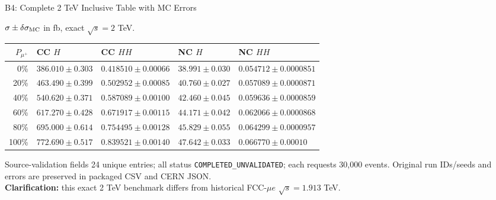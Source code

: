 \documentclass[aspectratio=1610,english]{beamer}
\newcommand{\src}[1]{\vfill{\par\color{black!65}\fontsize{6.4}{7.4}\selectfont\emph{Source:} #1\par}}
\begin{document}
\begin{frame}[t]{B4: Complete 2 TeV Inclusive Table with MC Errors}
\scriptsize

\begin{center}\scriptsize $\sigma\pm\delta\sigma_{\rm MC}$ in fb, exact $\sqrt{s}=2$ TeV.\end{center}
\begin{center}\setlength{\tabcolsep}{3pt}\renewcommand{\arraystretch}{1.23}\begin{tabular}{rllll}\toprule $P_{\mu^+}$ & CC $H$ & CC $HH$ & NC $H$ & NC $HH$ \\ \midrule
0\% & $386.010\pm0.303$ & $0.418510\pm0.00066$ & $38.991\pm0.030$ & $0.054712\pm0.0000851$ \\
20\% & $463.490\pm0.399$ & $0.502952\pm0.00085$ & $40.760\pm0.027$ & $0.057089\pm0.0000871$ \\
40\% & $540.620\pm0.371$ & $0.587089\pm0.00100$ & $42.460\pm0.045$ & $0.059636\pm0.0000859$ \\
60\% & $617.270\pm0.428$ & $0.671917\pm0.00115$ & $44.171\pm0.042$ & $0.062066\pm0.0000868$ \\
80\% & $695.000\pm0.614$ & $0.754495\pm0.00128$ & $45.829\pm0.055$ & $0.064299\pm0.0000957$ \\
100\% & $772.690\pm0.517$ & $0.839521\pm0.00140$ & $47.642\pm0.033$ & $0.066770\pm0.00010$ \\
\bottomrule\end{tabular}\end{center}
\vspace{-.4em}\begin{block}{Source-validation fields}\scriptsize
24 unique entries; all status \texttt{COMPLETED\_UNVALIDATED}; each requests 30,000 events. Original run IDs/seeds and errors are preserved in packaged CSV and CERN JSON.\\[.15em]
\textbf{Clarification:} this exact 2 TeV benchmark differs from historical FCC-$\mu e$ $\sqrt{s}=1.913$ TeV.
\end{block}

\end{frame}
\end{document}
